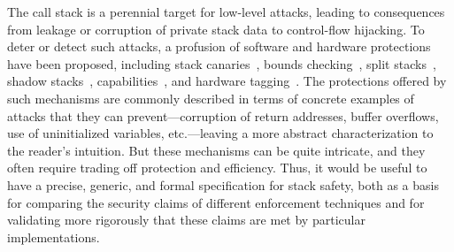 \documentclass[acmsmall,review,anonymous]{acmart}\settopmatter{printfolios=true,printccs=false,printacmref=false}
\begin{document}
The call stack is a perennial target for low-level attacks, leading to
consequences
from leakage or corruption of private stack data to
control-flow hijacking. To deter or detect such attacks, a profusion of
software and hardware protections have been proposed,
%
including stack canaries~\citep{Cowan+98},
bounds checking~\citep{NagarakatteZMZ09,NagarakatteZMZ10,DeviettiBMZ08},
split stacks~\citep{Kuznetsov+14},
shadow stacks~\citep{Dang+15,Shanbhogue+19},
capabilities~\citep{Woodruff+14,Chisnall+15,Skorstengaard+19,Skorstengaard+19b,Tsampas+19,Georges+21},
and hardware tagging~\citep{DBLP:conf/sp/RoesslerD18}. \ifaftersubmission{}
\fi
%
The protections offered by such mechanisms are commonly described in terms
of concrete examples of attacks that they can prevent---corruption
of return addresses, buffer overflows, use of uninitialized variables,
etc.---leaving a more abstract characterization to the reader's intuition.
But these mechanisms can be quite intricate,
and they often require trading off protection and efficiency.
Thus, it would be useful to have a precise, generic, and formal
specification for stack
safety, both as a basis for comparing the security claims of different
enforcement techniques and for validating more rigorously that these claims
are met by particular implementations.
\end{document}
